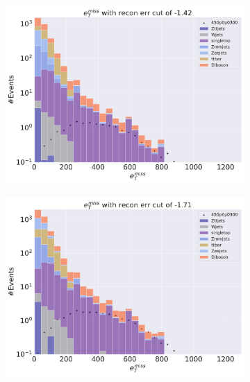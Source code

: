 \begin{figure}[H]
    \centering
    \begin{subfigure}{.45\textwidth}
        \includegraphics[width=\textwidth]{Figures/AE_testing/big/2lep/b_data_recon_big_rm3_feats_sig_450p0p0300_recon_errcut_-1.42.pdf}
        \caption{ }
        \label{fig:AE_2lep_big_450_cut_etmiss}
    \end{subfigure}
    \hfill
    \begin{subfigure}{.45\textwidth}
        \includegraphics[width=\textwidth]{Figures/AE_testing/small/2lep/b_data_recon_big_rm3_feats_sig_450p0p0300_recon_errcut_-1.71.pdf}
        \caption{}
        \label{fig:AE_2lep_small_450_cut_etmiss}
    \end{subfigure}

\end{figure}
